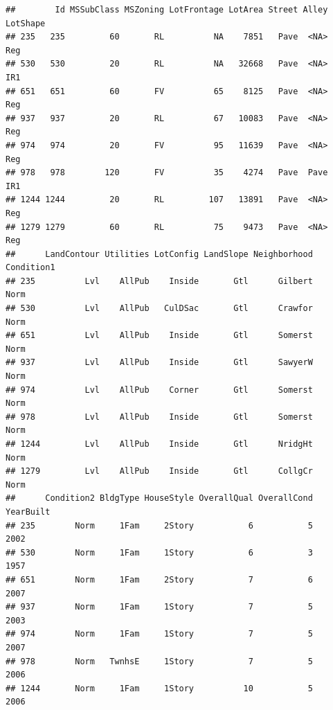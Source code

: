 \documentclass[]{article}
\newenvironment{Shaded}{\begin{snugshade}}{\end{snugshade}}
\newcommand{\KeywordTok}[1]{\textcolor[rgb]{0.13,0.29,0.53}{\textbf{#1}}}
\newcommand{\StringTok}[1]{\textcolor[rgb]{0.31,0.60,0.02}{#1}}
\newcommand{\OperatorTok}[1]{\textcolor[rgb]{0.81,0.36,0.00}{\textbf{#1}}}
\newcommand{\NormalTok}[1]{#1}
\begin{document}
\begin{Shaded}
\end{Shaded}

\begin{verbatim}
##        Id MSSubClass MSZoning LotFrontage LotArea Street Alley LotShape
## 235   235         60       RL          NA    7851   Pave  <NA>      Reg
## 530   530         20       RL          NA   32668   Pave  <NA>      IR1
## 651   651         60       FV          65    8125   Pave  <NA>      Reg
## 937   937         20       RL          67   10083   Pave  <NA>      Reg
## 974   974         20       FV          95   11639   Pave  <NA>      Reg
## 978   978        120       FV          35    4274   Pave  Pave      IR1
## 1244 1244         20       RL         107   13891   Pave  <NA>      Reg
## 1279 1279         60       RL          75    9473   Pave  <NA>      Reg
##      LandContour Utilities LotConfig LandSlope Neighborhood Condition1
## 235          Lvl    AllPub    Inside       Gtl      Gilbert       Norm
## 530          Lvl    AllPub   CulDSac       Gtl      Crawfor       Norm
## 651          Lvl    AllPub    Inside       Gtl      Somerst       Norm
## 937          Lvl    AllPub    Inside       Gtl      SawyerW       Norm
## 974          Lvl    AllPub    Corner       Gtl      Somerst       Norm
## 978          Lvl    AllPub    Inside       Gtl      Somerst       Norm
## 1244         Lvl    AllPub    Inside       Gtl      NridgHt       Norm
## 1279         Lvl    AllPub    Inside       Gtl      CollgCr       Norm
##      Condition2 BldgType HouseStyle OverallQual OverallCond YearBuilt
## 235        Norm     1Fam     2Story           6           5      2002
## 530        Norm     1Fam     1Story           6           3      1957
## 651        Norm     1Fam     2Story           7           6      2007
## 937        Norm     1Fam     1Story           7           5      2003
## 974        Norm     1Fam     1Story           7           5      2007
## 978        Norm   TwnhsE     1Story           7           5      2006
## 1244       Norm     1Fam     1Story          10           5      2006

\end{verbatim}
\end{document}
